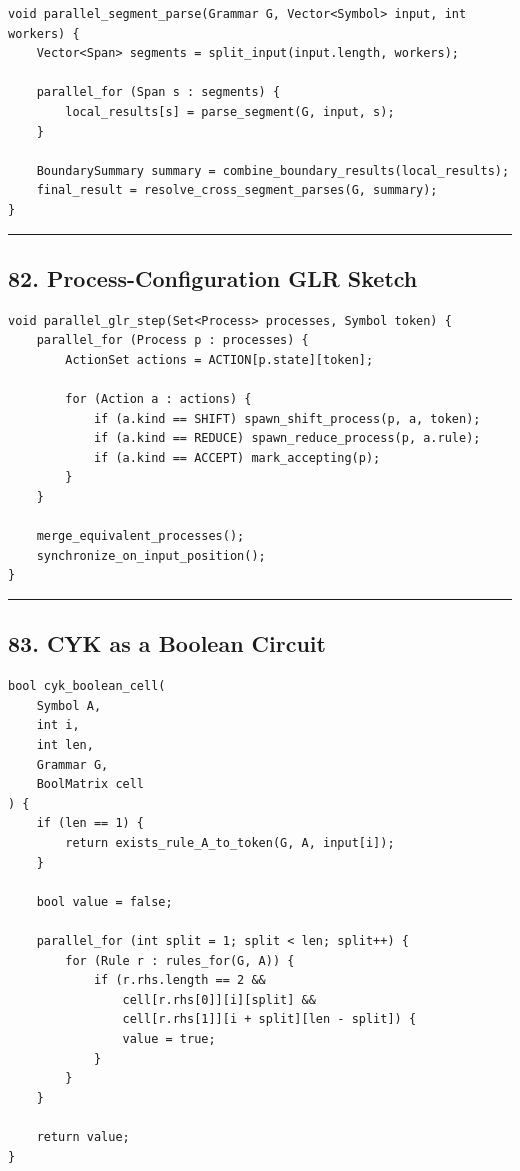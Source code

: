 \documentclass[10pt,letterpaper]{article}
\begin{document}
\begin{verbatim}
void parallel_segment_parse(Grammar G, Vector<Symbol> input, int workers) {
    Vector<Span> segments = split_input(input.length, workers);

    parallel_for (Span s : segments) {
        local_results[s] = parse_segment(G, input, s);
    }

    BoundarySummary summary = combine_boundary_results(local_results);
    final_result = resolve_cross_segment_parses(G, summary);
}
\end{verbatim}

\medskip\hrule\medskip

\subsection*{82. Process-Configuration GLR Sketch}

\begin{verbatim}
void parallel_glr_step(Set<Process> processes, Symbol token) {
    parallel_for (Process p : processes) {
        ActionSet actions = ACTION[p.state][token];

        for (Action a : actions) {
            if (a.kind == SHIFT) spawn_shift_process(p, a, token);
            if (a.kind == REDUCE) spawn_reduce_process(p, a.rule);
            if (a.kind == ACCEPT) mark_accepting(p);
        }
    }

    merge_equivalent_processes();
    synchronize_on_input_position();
}
\end{verbatim}

\medskip\hrule\medskip

\subsection*{83. CYK as a Boolean Circuit}

\begin{verbatim}
bool cyk_boolean_cell(
    Symbol A,
    int i,
    int len,
    Grammar G,
    BoolMatrix cell
) {
    if (len == 1) {
        return exists_rule_A_to_token(G, A, input[i]);
    }

    bool value = false;

    parallel_for (int split = 1; split < len; split++) {
        for (Rule r : rules_for(G, A)) {
            if (r.rhs.length == 2 &&
                cell[r.rhs[0]][i][split] &&
                cell[r.rhs[1]][i + split][len - split]) {
                value = true;
            }
        }
    }

    return value;
}
\end{verbatim}
\end{document}
